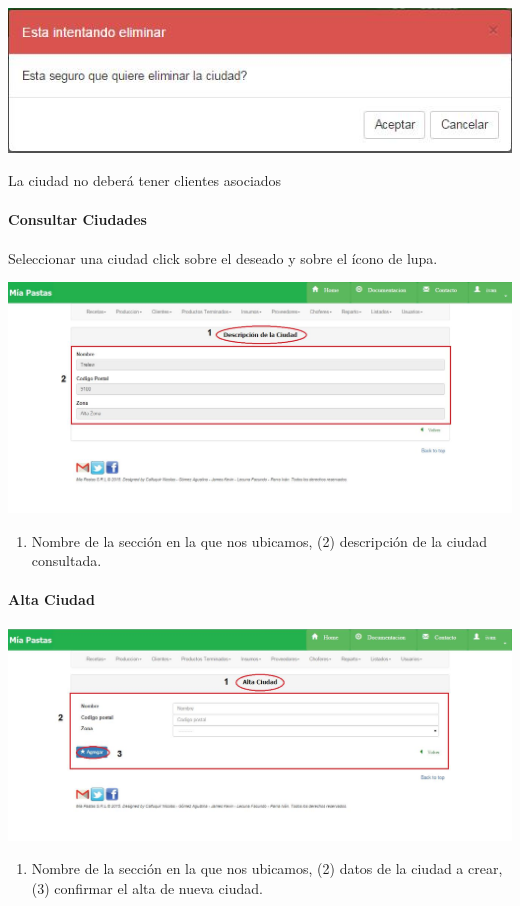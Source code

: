 \documentclass[letterpaper,10pt,english]{sphinxmanual}
\begin{document}
\includegraphics{ciudades_eliminar.jpg}

La ciudad no deberá tener clientes asociados


\paragraph{{}Consultar Ciudades}
\label{ciudades consultar:consultar-ciudades}\label{ciudades consultar::doc}
Seleccionar una ciudad click sobre el deseado y sobre el ícono de lupa.

\includegraphics{ciudades_detalle.jpg}
\begin{enumerate}
\item {} 
Nombre de la sección en la que nos ubicamos, (2) descripción de la ciudad consultada.

\end{enumerate}


\paragraph{{}Alta Ciudad}
\label{ciudades alta:alta-ciudad}\label{ciudades alta::doc}
\includegraphics{ciudades_alta.jpg}
\begin{enumerate}
\item {} 
Nombre de la sección en la que nos ubicamos, (2) datos de la ciudad a crear, (3) confirmar el alta de nueva ciudad.

\end{enumerate}
\end{document}
